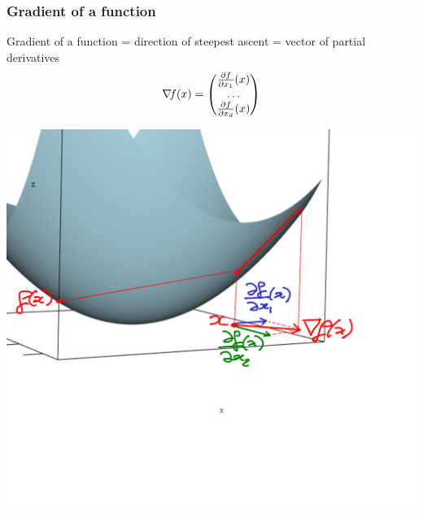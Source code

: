 \documentclass[12pt]{beamer}
\begin{document}
\begin{frame}
\frametitle{Gradient of a function} 
Gradient of a function = direction of steepest ascent = vector of partial derivatives
\begin{equation*}
\nabla\!{f}(x) = \begin{pmatrix} \frac{\partial f}{\partial x_1}(x) \\ \ldots \\ \frac{\partial f}{\partial x_d}(x) \end{pmatrix}
\end{equation*}
\begin{center}
\begin{minipage}[t]{0.7\textwidth}
\includegraphics[width=\textwidth]{gradient-crop.pdf} \\
\end{minipage}
\end{center}
\end{frame}
\end{document}
